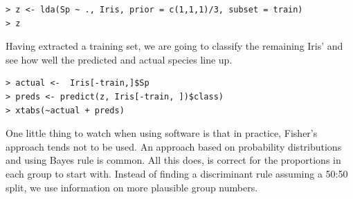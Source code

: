 \begin{verbatim}
> z <- lda(Sp ~ ., Iris, prior = c(1,1,1)/3, subset = train)
> z
\end{verbatim}


Having extracted a training set, we are going to classify the remaining Iris' and see how well the predicted and actual species line up.

\singlespacing
\begin{verbatim}
> actual <-  Iris[-train,]$Sp
> preds <- predict(z, Iris[-train, ])$class)
> xtabs(~actual + preds)
\end{verbatim}
\onehalfspacing


One little thing to watch when using software is that in practice, Fisher's approach tends not to be used.   An approach based on probability distributions and using Bayes rule is common.   All this does, is correct for the proportions in each group to start with.   Instead of finding a discriminant rule assuming a 50:50 split, we use information on more plausible group numbers.

